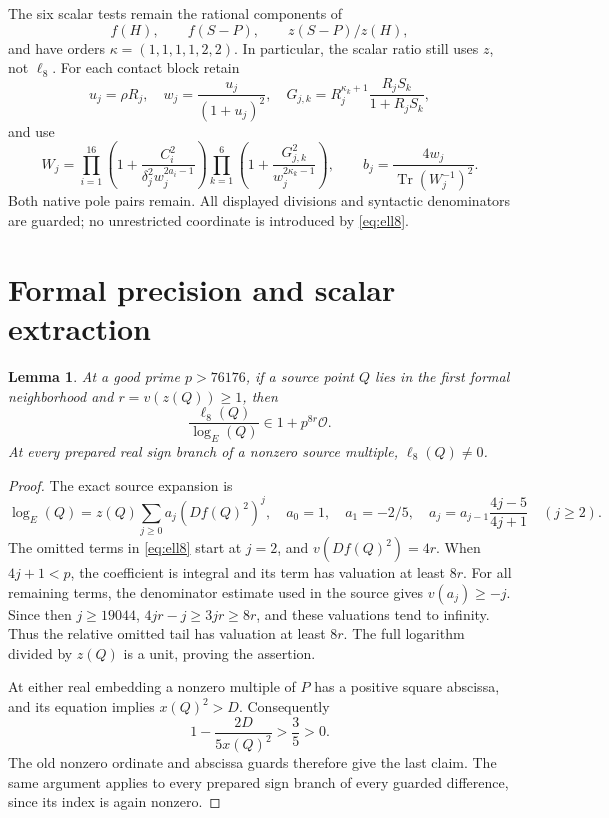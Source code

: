 \documentclass[11pt,a4paper]{article}
\newtheorem{lemma}[theorem]{Lemma}
\DeclareMathOperator{\Tr}{Tr}
\begin{document}
The six scalar tests remain the rational components of
\[
 f(H),\qquad f(S-P),\qquad z(S-P)/z(H),
\]
and have orders \(\kappa=(1,1,1,1,2,2)\).
In particular, the scalar ratio still uses \(z\), not \(\ell_8\).
For each contact block retain
\[
 u_j=\rho R_j,\quad w_j=\frac{u_j}{(1+u_j)^2},\quad
 G_{j,k}=R_j^{\kappa_k+1}\frac{R_jS_k}{1+R_jS_k},
\]
and use
\begin{equation}\label{eq:detector}
 W_j=\prod_{i=1}^{16}\left(1+
 \frac{C_i^2}{\delta_j^2w_j^{2a_i-1}}\right)
 \prod_{k=1}^6\left(1+\frac{G_{j,k}^2}{w_j^{2\kappa_k-1}}\right),
 \qquad b_j=\frac{4w_j}{\Tr(W_j^{-1})^2}.
\end{equation}
Both native pole pairs remain. All displayed divisions and syntactic
denominators are guarded; no unrestricted coordinate is introduced by
\eqref{eq:ell8}.

\section{Formal precision and scalar extraction}

\begin{lemma}\label{lem:formal}
At a good prime \(p>76176\), if a source point \(Q\) lies in the
first formal neighborhood and \(r=v(z(Q))\ge1\), then
\[
 \frac{\ell_8(Q)}{\log_E(Q)}\in1+p^{8r}\mathcal O.
\]
At every prepared real sign branch of a nonzero source multiple,
\(\ell_8(Q)\ne0\).
\end{lemma}
\begin{proof}
The exact source expansion is
\[
 \log_E(Q)=z(Q)\sum_{j\ge0}a_j(Df(Q)^2)^j,
 \quad a_0=1,\quad a_1=-2/5,\quad
 a_j=a_{j-1}\frac{4j-5}{4j+1}\quad(j\ge2).
\]
The omitted terms in \eqref{eq:ell8} start at \(j=2\), and
\(v(Df(Q)^2)=4r\). When \(4j+1<p\), the coefficient is
integral and its term has valuation at least \(8r\).
For all remaining terms, the denominator estimate used in the source
gives \(v(a_j)\ge-j\). Since then \(j\ge19044\),
\(4jr-j\ge3jr\ge8r\), and these valuations tend to infinity.
Thus the relative omitted tail has valuation at least \(8r\).
The full logarithm divided by \(z(Q)\) is a unit, proving the assertion.

At either real embedding a nonzero multiple of \(P\) has a positive
square abscissa, and its equation implies \(x(Q)^2>D\).
Consequently
\[
 1-\frac{2D}{5x(Q)^2}>\frac35>0.
\]
The old nonzero ordinate and abscissa guards therefore give the last claim.
The same argument applies to every prepared sign branch of every
guarded difference, since its index is again nonzero.
\end{proof}
\end{document}
